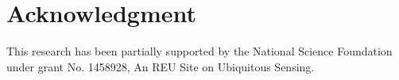 \documentclass[conference]{IEEEtran}
\begin{document}
\section*{Acknowledgment}
This research has been partially supported by the National Science Foundation under grant No. 1458928, An REU Site on Ubiquitous Sensing.




\end{document}
